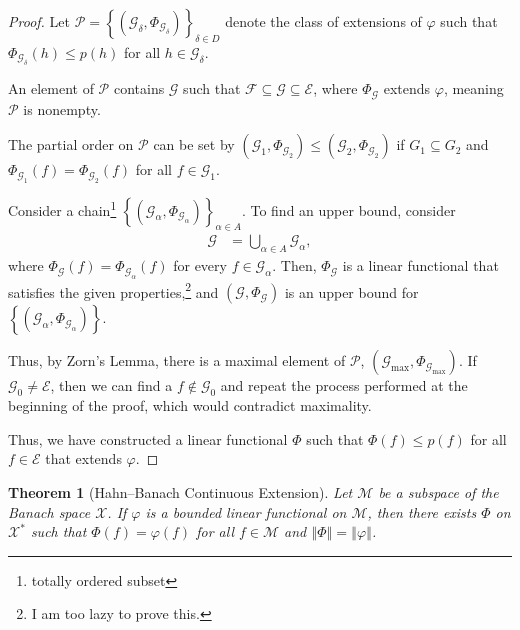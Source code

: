 \documentclass[10pt]{extarticle}
\newcommand{\norm}[1]{\left\Vert #1\right\Vert}
\newcommand{\set}[1]{\left\{#1\right\}}
\theoremstyle{plain}
\newtheorem*{theorem}{Theorem}
\theoremstyle{definition}
\theoremstyle{note}
\renewcommand{\newline}{\hfill\break}
\begin{document}
\begin{proof}
  Let $\mathcal{P} = \set{(\mathcal{G}_{\delta},\Phi_{\mathcal{G}_{\delta}})}_{\delta \in D}$ denote the class of extensions of $\varphi$ such that $\Phi_{\mathcal{G}_{\delta}}(h) \leq p(h)$ for all $h\in \mathcal{G}_{\delta}$.\newline

  An element of $\mathcal{P}$ contains $\mathcal{G}$ such that $\mathcal{F}\subseteq \mathcal{G}\subseteq \mathcal{E}$, where $\Phi_{\mathcal{G}}$ extends $\varphi$, meaning $\mathcal{P}$ is nonempty.\newline

  The partial order on $\mathcal{P}$ can be set by $\left(\mathcal{G}_{1},\Phi_{\mathcal{G}_2}\right)\leq \left(\mathcal{G}_{2},\Phi_{\mathcal{G}_{2}}\right)$ if $G_1\subseteq G_2$ and $\Phi_{\mathcal{G}_1}(f) = \Phi_{\mathcal{G}_{2}}(f)$ for all $f\in \mathcal{G}_{1}$.\newline

  Consider a chain\footnote{totally ordered subset} $\set{\left(\mathcal{G}_{\alpha},\Phi_{\mathcal{G}_{\alpha}}\right)}_{\alpha \in A}$. To find an upper bound, consider
  \begin{align*}
    \mathcal{G} &= \bigcup_{\alpha \in A}\mathcal{G}_{\alpha},
  \end{align*}
  where $\Phi_{\mathcal{G}}(f) = \Phi_{\mathcal{G}_{\alpha}}(f)$ for every $f\in \mathcal{G}_{\alpha}$. Then, $\Phi_{\mathcal{G}}$ is a linear functional that satisfies the given properties,\footnote{I am too lazy to prove this.} and $\left(\mathcal{G},\Phi_{\mathcal{G}}\right)$ is an upper bound for $\set{\left(\mathcal{G}_{\alpha},\Phi_{\mathcal{G}_{\alpha}}\right)}$.\newline

  Thus, by Zorn's Lemma, there is a maximal element of $\mathcal{P}$, $\left(\mathcal{G}_{\text{max}},\Phi_{\mathcal{G}_{\text{max}}}\right)$. If $\mathcal{G}_0\neq \mathcal{E}$, then we can find a $f\notin \mathcal{G}_{0}$ and repeat the process performed at the beginning of the proof, which would contradict maximality.\newline

  Thus, we have constructed a linear functional $\Phi$ such that $\Phi(f) \leq p(f)$ for all $f\in \mathcal{E}$ that extends $\varphi$.
\end{proof}
\begin{theorem}[Hahn--Banach Continuous Extension]
  Let $\mathcal{M}$ be a subspace of the Banach space $\mathcal{X}$. If $\varphi$ is a bounded linear functional on $\mathcal{M}$, then there exists $\Phi$ on $\mathcal{X}^{\ast}$ such that $\Phi(f) = \varphi(f)$ for all $f\in \mathcal{M}$ and $\norm{\Phi} = \norm{\varphi}$.
\end{theorem}
\end{document}
